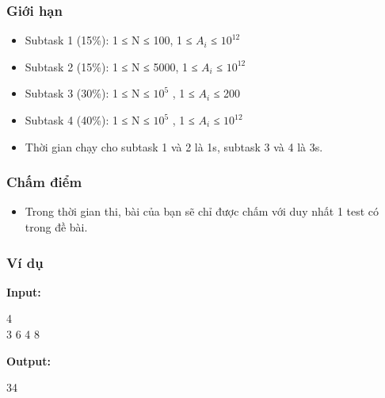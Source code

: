 \subsubsection{   Giới hạn  }
\begin{itemize}
	\item     Subtask 1 (15\%): 1 ≤ N ≤ 100, 1 ≤ $A_{i}$    ≤ $10^{12}$
	\item     Subtask 2 (15\%): 1 ≤ N ≤ 5000, 1 ≤ $A_{i}$    ≤ $10^{12}$
	\item     Subtask 3 (30\%): 1 ≤ N ≤ $10^{5}$    , 1 ≤ $A_{i}$    ≤ 200   
	\item     Subtask 4 (40\%): 1 ≤ N ≤ $10^{5}$    , 1 ≤ $A_{i}$    ≤ $10^{12}$
	\item     Thời gian chạy cho subtask 1 và 2 là 1s, subtask 3 và 4 là 3s.   
\end{itemize}

\subsubsection{   Chấm điểm  }
\begin{itemize}
	\item     Trong thời gian thi, bài của bạn sẽ chỉ được chấm với duy nhất 1 test có trong đề bài.   
\end{itemize}

\subsubsection{   Ví dụ  }

\textbf{    Input:   }

   4   
\\   3 6 4 8  

\textbf{    Output:   }

   34  
